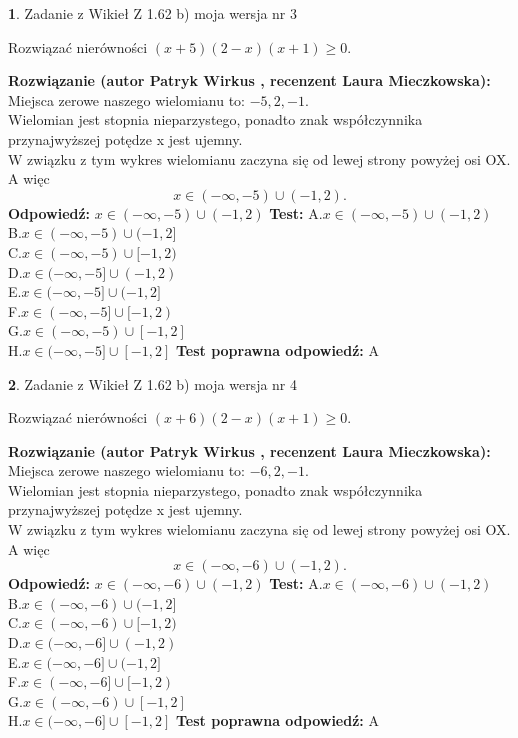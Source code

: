 \documentclass[12pt, a4paper]{article}
\theoremstyle{definition} %
\newtheorem{zad}{}
\newcommand{\zadStart}[1]{\begin{zad}#1\newline}
\newcommand{\zadStop}{\end{zad}}
\newcommand{\rozwStart}[2]{\noindent \textbf{Rozwiązanie (autor #1 , recenzent #2): }\newline}
\newcommand{\rozwStop}{\newline}
\newcommand{\odpStart}{\noindent \textbf{Odpowiedź:}\newline}
\newcommand{\odpStop}{\newline}
\newcommand{\testStart}{\noindent \textbf{Test:}\newline}
\newcommand{\testStop}{\newline}
\newcommand{\kluczStart}{\noindent \textbf{Test poprawna odpowiedź:}\newline}
\newcommand{\kluczStop}{\newline}
\begin{document}
\zadStart{Zadanie z Wikieł Z 1.62 b) moja wersja nr 3}

Rozwiązać nierówności $(x+5)(2-x)(x+1)\ge0$.
\zadStop
\rozwStart{Patryk Wirkus}{Laura Mieczkowska}
Miejsca zerowe naszego wielomianu to: $-5, 2, -1$.\\
Wielomian jest stopnia nieparzystego, ponadto znak współczynnika przy\linebreak najwyższej potędze x jest ujemny.\\ W związku z tym wykres wielomianu zaczyna się od lewej strony powyżej osi OX. A więc $$x \in (-\infty,-5) \cup (-1,2).$$
\rozwStop
\odpStart
$x \in (-\infty,-5) \cup (-1,2)$
\odpStop
\testStart
A.$x \in (-\infty,-5) \cup (-1,2)$\\
B.$x \in (-\infty,-5) \cup (-1,2]$\\
C.$x \in (-\infty,-5) \cup [-1,2)$\\
D.$x \in (-\infty,-5] \cup (-1,2)$\\
E.$x \in (-\infty,-5] \cup (-1,2]$\\
F.$x \in (-\infty,-5] \cup [-1,2)$\\
G.$x \in (-\infty,-5) \cup [-1,2]$\\
H.$x \in (-\infty,-5] \cup [-1,2]$
\testStop
\kluczStart
A
\kluczStop



\zadStart{Zadanie z Wikieł Z 1.62 b) moja wersja nr 4}

Rozwiązać nierówności $(x+6)(2-x)(x+1)\ge0$.
\zadStop
\rozwStart{Patryk Wirkus}{Laura Mieczkowska}
Miejsca zerowe naszego wielomianu to: $-6, 2, -1$.\\
Wielomian jest stopnia nieparzystego, ponadto znak współczynnika przy\linebreak najwyższej potędze x jest ujemny.\\ W związku z tym wykres wielomianu zaczyna się od lewej strony powyżej osi OX. A więc $$x \in (-\infty,-6) \cup (-1,2).$$
\rozwStop
\odpStart
$x \in (-\infty,-6) \cup (-1,2)$
\odpStop
\testStart
A.$x \in (-\infty,-6) \cup (-1,2)$\\
B.$x \in (-\infty,-6) \cup (-1,2]$\\
C.$x \in (-\infty,-6) \cup [-1,2)$\\
D.$x \in (-\infty,-6] \cup (-1,2)$\\
E.$x \in (-\infty,-6] \cup (-1,2]$\\
F.$x \in (-\infty,-6] \cup [-1,2)$\\
G.$x \in (-\infty,-6) \cup [-1,2]$\\
H.$x \in (-\infty,-6] \cup [-1,2]$
\testStop
\kluczStart
A
\kluczStop
\end{document}
